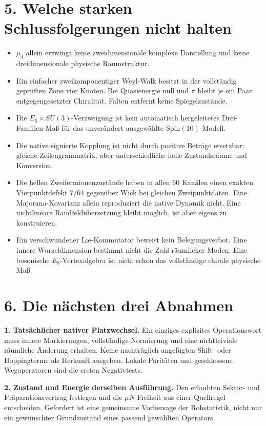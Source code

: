 \chapter*{5. Welche starken Schlussfolgerungen nicht halten}
\begin{itemize}
\item $\mu_4$ allein erzwingt keine zweidimensionale komplexe Darstellung und keine dreidimensionale physische Raumstruktur.
\item Ein einfacher zweikomponentiger Weyl-Walk besitzt in der vollständig geprüften Zone vier Knoten. Bei Quasienergie null und $\pi$ bleibt je ein Paar entgegengesetzter Chiralität. Falten entfernt keine Spiegelzustände.
\item Die $E_6\times SU(3)$-Verzweigung ist kein automatisch hergeleitetes Drei-Familien-Maß für das unverändert ausgewählte $\mathrm{Spin}(10)$-Modell.
\item Die native signierte Kopplung ist nicht durch positive Beträge ersetzbar: gleiche Zeilengrammatrix, aber unterschiedliche helle Zustandsräume und Konversion.
\item Die hellen Zweifermionenzustände haben in allen 60 Kanälen einen exakten Vierpunktdefekt $7/64$ gegenüber Wick bei gleichen Zweipunktdaten. Eine Majorana-Kovarianz allein reproduziert die native Dynamik nicht. Eine nichtlineare Randfeldübersetzung bleibt möglich, ist aber eigens zu konstruieren.
\item Ein verschwundener Lie-Kommutator beweist kein Belegungsverbot. Eine innere Wurzeldimension bestimmt nicht die Zahl räumlicher Moden. Eine bosonische $E_8$-Vertexalgebra ist nicht schon das vollständige chirale physische Maß.
\end{itemize}

\chapter*{6. Die nächsten drei Abnahmen}
\textbf{1. Tatsächlicher nativer Platzwechsel.} Ein einziges explizites Operationswort muss innere Markierungen, vollständige Normierung und eine nichttriviale räumliche Änderung erhalten. Keine nachträglich angefügten Shift- oder Hoppingterme als Herkunft ausgeben. Lokale Paritäten und geschlossene Wegoperatoren sind die ersten Negativtests.

\textbf{2. Zustand und Energie derselben Ausführung.} Den erlaubten Sektor- und Präparationsvertrag festlegen und die $\mu N$-Freiheit aus einer Quellregel entscheiden. Gefordert ist eine gemeinsame Vorhersage der Rohstatistik, nicht nur ein gewünschter Grundzustand eines passend gewählten Operators.

